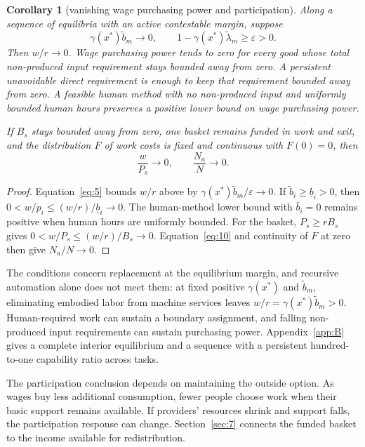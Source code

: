 \documentclass[12pt]{article}
\theoremstyle{plain}
\newtheorem*{corollary}{Corollary}
\begin{document}
\begin{corollary}[vanishing wage purchasing power and participation]
Along a sequence of equilibria with an active contestable margin, suppose
\[
\gamma(x^*)\widetilde b_m\to0,\qquad
1-\gamma(x^*)\widetilde\lambda_m\ge\varepsilon>0.
\]
Then $w/r\to0$. Wage purchasing power tends to zero for every good whose total non-produced input requirement stays bounded away from zero. A persistent unavoidable direct requirement is enough to keep that requirement bounded away from zero. A feasible human method with no non-produced input and uniformly bounded human hours preserves a positive lower bound on wage purchasing power.

If $B_s$ stays bounded away from zero, one basket remains funded in work and exit, and the distribution $F$ of work costs is fixed and continuous with $F(0)=0$, then
\begin{equation}\label{eq:14}
\frac{w}{P_s}\to0,\qquad
\frac{N_a}{N}\to0.
\end{equation}
\end{corollary}

\begin{proof}
Equation~\eqref{eq:5} bounds $w/r$ above by $\gamma(x^*)\widetilde b_m/\varepsilon\to0$. If $\widetilde b_i\ge\underline b_i>0$, then $0<w/p_i\le(w/r)/\underline b_i\to0$. The human-method lower bound with $\bar b_i=0$ remains positive when human hours are uniformly bounded. For the basket, $P_s\ge rB_s$ gives $0<w/P_s\le(w/r)/B_s\to0$. Equation~\eqref{eq:10} and continuity of $F$ at zero then give $N_a/N\to0$.
\end{proof}

The conditions concern replacement at the equilibrium margin, and recursive automation alone does not meet them: at fixed positive $\gamma(x^*)$ and $\widetilde b_m$, eliminating embodied labor from machine services leaves $w/r=\gamma(x^*)\widetilde b_m>0$. Human-required work can sustain a boundary assignment, and falling non-produced input requirements can sustain purchasing power. Appendix~\ref{app:B} gives a complete interior equilibrium and a sequence with a persistent hundred-to-one capability ratio across tasks.

The participation conclusion depends on maintaining the outside option. As wages buy less additional consumption, fewer people choose work when their basic support remains available. If providers' resources shrink and support falls, the participation response can change. Section~\ref{sec:7} connects the funded basket to the income available for redistribution.
\end{document}
